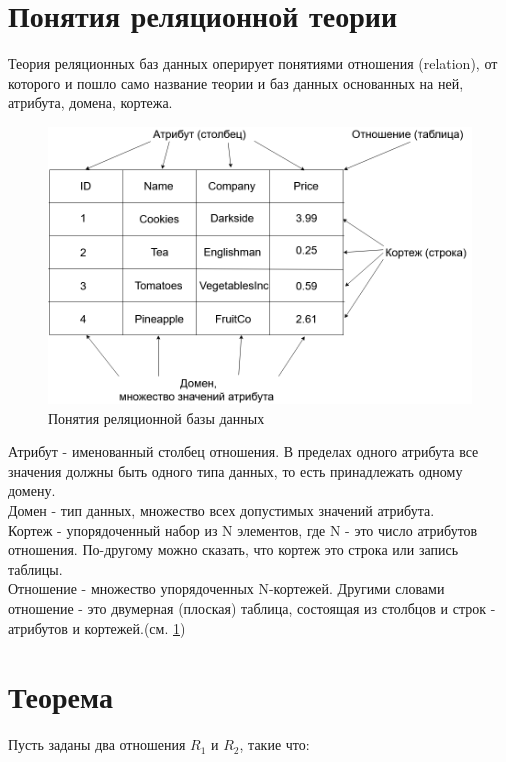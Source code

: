 \section{Понятия реляционной теории}
\indent Теория реляционных баз данных оперирует понятиями отношения (relation), от которого и пошло само название теории и баз данных основанных на ней, атрибута, домена, кортежа.

\begin{figure}[ht]
	\centering
	\includegraphics[width=\linewidth]{pics/databaseExample.png}
	\caption{Понятия реляционной базы данных}
	\label{fig:dbExample}
\end{figure}

\indent Атрибут - именованный столбец отношения.
В пределах одного атрибута все значения должны быть одного типа данных, то есть принадлежать одному домену.\\
\indent Домен - тип данных, множество всех допустимых значений атрибута.\\
\indent Кортеж - упорядоченный набор из N элементов, где N - это число атрибутов отношения.
По-другому можно сказать, что кортеж это строка или запись таблицы.\\
\indent Отношение - множество упорядоченных N-кортежей.
Другими словами отношение - это двумерная (плоская) таблица, состоящая из столбцов и строк - атрибутов и кортежей.(см. \ref{fig:dbExample})\\

\section{Теорема}
\indent Пусть заданы два отношения $R_1$ и $R_2$, такие что:

